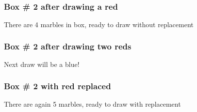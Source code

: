 \documentclass[handout]{beamer}
\begin{document}
   \begin{frame}
   \frametitle{Box \# 2 after drawing a red}
   \begin{center}
   \end{center}
   There are 4 marbles in box, ready to draw without replacement
   \end{frame}



   \begin{frame}
   \frametitle{Box \# 2 after drawing two reds}
   \begin{center}
   \end{center}
   Next draw will be a blue!
   \end{frame}



   \begin{frame}
   \frametitle{Box \# 2 with red replaced}
   \begin{center}
   \end{center}
   There are again 5 marbles, ready to draw with replacement
   \end{frame}
\end{document}
